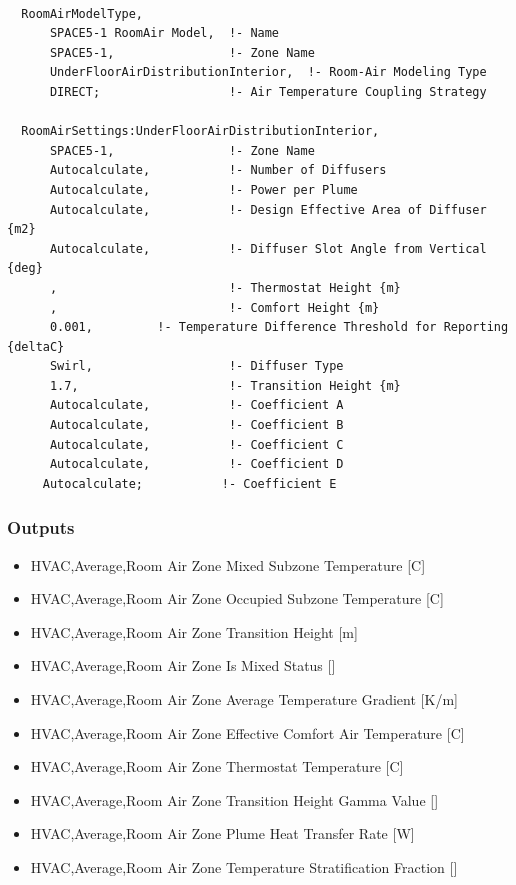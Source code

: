 \begin{lstlisting}

  RoomAirModelType,
      SPACE5-1 RoomAir Model,  !- Name
      SPACE5-1,                !- Zone Name
      UnderFloorAirDistributionInterior,  !- Room-Air Modeling Type
      DIRECT;                  !- Air Temperature Coupling Strategy

  RoomAirSettings:UnderFloorAirDistributionInterior,
      SPACE5-1,                !- Zone Name
      Autocalculate,           !- Number of Diffusers
      Autocalculate,           !- Power per Plume
      Autocalculate,           !- Design Effective Area of Diffuser {m2}
      Autocalculate,           !- Diffuser Slot Angle from Vertical {deg}
      ,                        !- Thermostat Height {m}
      ,                        !- Comfort Height {m}
      0.001,         !- Temperature Difference Threshold for Reporting {deltaC}
      Swirl,                   !- Diffuser Type
      1.7,                     !- Transition Height {m}
      Autocalculate,           !- Coefficient A
      Autocalculate,           !- Coefficient B
      Autocalculate,           !- Coefficient C
      Autocalculate,           !- Coefficient D
     Autocalculate;           !- Coefficient E
\end{lstlisting}

\subsubsection{Outputs}\label{roomairsettingsunderfloorairdistributioninterior-outputs}

\begin{itemize}
\item
  HVAC,Average,Room Air Zone Mixed Subzone Temperature {[}C{]}
\item
  HVAC,Average,Room Air Zone Occupied Subzone Temperature {[}C{]}
\item
  HVAC,Average,Room Air Zone Transition Height {[}m{]}
\item
  HVAC,Average,Room Air Zone Is Mixed Status {[]}
\item
  HVAC,Average,Room Air Zone Average Temperature Gradient {[}K/m{]}
\item
  HVAC,Average,Room Air Zone Effective Comfort Air Temperature {[}C{]}
\item
  HVAC,Average,Room Air Zone Thermostat Temperature {[}C{]}
\item
  HVAC,Average,Room Air Zone Transition Height Gamma Value {[]}
\item
  HVAC,Average,Room Air Zone Plume Heat Transfer Rate {[}W{]}
\item
  HVAC,Average,Room Air Zone Temperature Stratification Fraction {[]}
\end{itemize}

